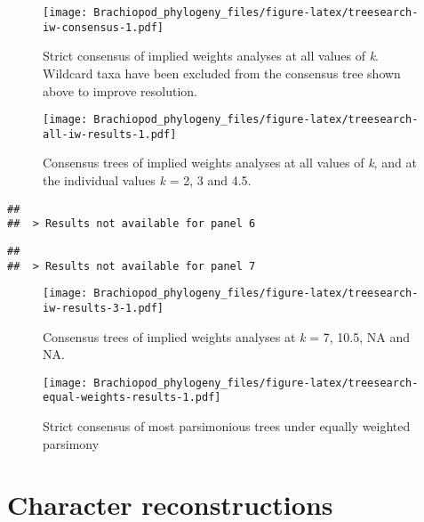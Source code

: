 \documentclass[openany]{book}
\theoremstyle{definition}
\theoremstyle{definition}
\theoremstyle{definition}
\theoremstyle{remark}
\begin{document}
\begin{figure}
\centering
\texttt{[image: Brachiopod\_phylogeny\_files/figure-latex/treesearch-iw-consensus-1.pdf]}
\caption{\label{fig:treesearch-iw-consensus}Strict consensus of implied weights analyses at all
values of \emph{k}. Wildcard taxa have been excluded from the consensus
tree shown above to improve resolution.}
\end{figure}








\clearpage 

\begin{figure}
\centering
\texttt{[image: Brachiopod\_phylogeny\_files/figure-latex/treesearch-all-iw-results-1.pdf]}
\caption{\label{fig:treesearch-all-iw-results}Consensus trees of implied weights analyses
at all values of \emph{k}, and at the individual
values \emph{k} = 2, 3 and 4.5.}
\end{figure}

\clearpage 

\begin{verbatim}
## 
##  > Results not available for panel 6
\end{verbatim}

\begin{verbatim}
## 
##  > Results not available for panel 7
\end{verbatim}

\begin{figure}
\centering
\texttt{[image: Brachiopod\_phylogeny\_files/figure-latex/treesearch-iw-results-3-1.pdf]}
\caption{\label{fig:treesearch-iw-results-3}Consensus trees of implied weights analyses
at \emph{k} = 7, 10.5, NA and NA.}
\end{figure}

\clearpage

\begin{figure}
\centering
\texttt{[image: Brachiopod\_phylogeny\_files/figure-latex/treesearch-equal-weights-results-1.pdf]}
\caption{\label{fig:treesearch-equal-weights-results}Strict consensus of
most parsimonious trees under equally weighted parsimony}
\end{figure}

\clearpage

\hypertarget{reconstructions}{\chapter{Character
reconstructions}\label{reconstructions}}
\end{document}
